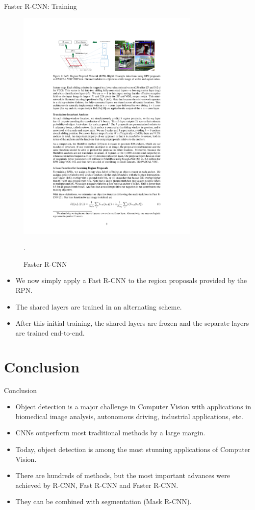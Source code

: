 \documentclass[xcolor=pdftex,dvipsnames,table]{beamer}
\begin{document}
\begin{frame}{Faster R-CNN: Training}
\begin{figure}[htb]
   \centering
   \includegraphics[width=0.8\textwidth]{../graphics/Faster_R-CNN.pdf}
   \caption{Faster R-CNN \cite{Ren2017}}.
\end{figure}
\begin{itemize}
\item We now simply apply a Fast R-CNN to the region proposals provided by the RPN.
\item The shared layers are trained in an alternating scheme.
\item After this initial training, the shared layers are frozen and the separate layers are trained end-to-end.
\end{itemize}
\end{frame}

\section{Conclusion}

\begin{frame}{Conclusion}
\begin{itemize}
\item Object detection is a major challenge in Computer Vision with applications in biomedical image analysis, autonomous driving, industrial applications, etc.
\item CNNs outperform most traditional methods by a large margin. 
\item Today, object detection is among the most stunning applications of Computer Vision. 
\item There are hundreds of methods, but the most important advances were achieved by R-CNN, Fast R-CNN and Faster R-CNN. 
\item They can be combined with segmentation (Mask R-CNN). 
\end{itemize}
\end{frame}
\end{document}

